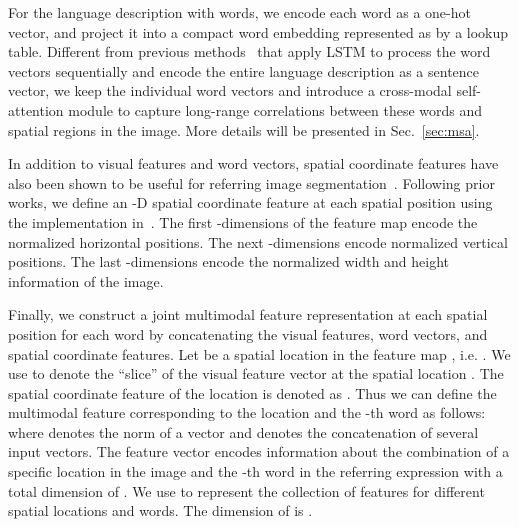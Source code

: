 \documentclass[10pt,twocolumn,letterpaper]{article}
\begin{document}
For the language description with  words, we encode each word  as a one-hot vector, and project it into a compact word embedding represented as  by a lookup table. Different from previous methods~\cite{hu2016segmentation,li2018referring,shi2018key} that apply LSTM to process the word vectors sequentially and encode the entire language description as a sentence vector, we keep the individual word vectors and introduce a cross-modal self-attention module to capture long-range correlations between these words and spatial regions in the image. More details will be presented in Sec.~\ref{sec:msa}.



In addition to visual features and word vectors, spatial coordinate features have also been shown to be useful for referring image segmentation~\cite{hu2016segmentation,li2018referring,liu2017recurrent}. Following prior works, we define an -D spatial coordinate feature at each spatial position using the implementation in~\cite{liu2017recurrent}. The first -dimensions of the feature map encode the normalized horizontal positions. The next -dimensions encode normalized vertical positions. The last -dimensions encode the normalized width and height information of the image.  



Finally, we construct a joint multimodal feature representation at each spatial position for each word by concatenating the visual features, word vectors, and spatial coordinate features. Let  be a spatial location in the feature map , i.e. . We use  to denote the ``slice'' of the visual feature vector at the spatial location . The spatial coordinate feature of the location  is denoted as . Thus we can define the multimodal feature  corresponding to the location  and the -th word as follows:
where  denotes the  norm of a vector and  denotes the concatenation of several input vectors. The feature vector  encodes information about the combination of a specific location  in the image and the -th word  in the referring expression with a total dimension of . We use  to represent the collection of features  for different spatial locations and words. The dimension of  is .
\end{document}

